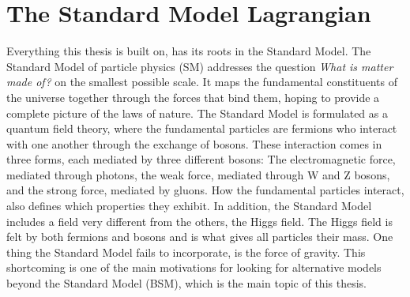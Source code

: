 \section{The Standard Model Lagrangian}
Everything this thesis is built on, has its roots in the Standard Model. The Standard Model of particle physics (SM) addresses the question \emph{What is matter made of?} on the smallest possible scale. It maps the fundamental constituents of the universe together through the forces that bind them, hoping to provide a complete picture of the laws of nature. The Standard Model is formulated as a quantum field theory, where the fundamental particles are fermions who interact with one another through the exchange of bosons. These interaction comes in three forms, each mediated by three different bosons: The electromagnetic force, mediated through photons, the weak force, mediated through W and Z bosons, and the strong force, mediated by gluons. How the fundamental particles interact, also defines which properties they exhibit. In addition, the Standard Model includes a field very different from the others, the Higgs field. The Higgs field is felt by both fermions and bosons and is what gives all particles their mass.\newline
One thing the Standard Model fails to incorporate, is the force of gravity. This shortcoming is one of the main motivations for looking for alternative models beyond the Standard Model (BSM), which is the main topic of this thesis.

